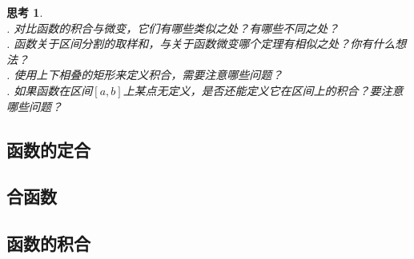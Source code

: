\documentclass[12pt,UTF8]{ctexbook}
\newtheorem{sk}{思考}[section]
\begin{document}
\begin{sk}
    \mbox{} \\
    . 对比函数的积合与微变，它们有哪些类似之处？有哪些不同之处？\\
    . 函数关于区间分割的取样和，与关于函数微变哪个定理有相似之处？你有什么想法？\\
    . 使用上下相叠的矩形来定义积合，需要注意哪些问题？\\
    . 如果函数在区间$[a, b]$上某点无定义，是否还能定义它在区间上的积合？要注意哪些问题？
\end{sk}

\section{函数的定合}
\section{合函数}


\begin{appendix}

\chapter{函数的积合}

\end{appendix}
\end{document}

